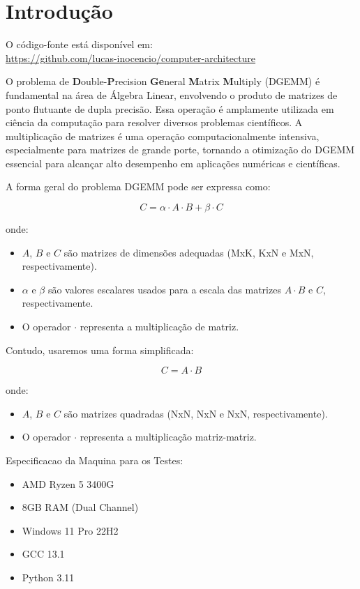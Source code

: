 \documentclass[12pt]{article}
\begin{document}
\section{Introdução}

O código-fonte está disponível em: \\
\url{https://github.com/lucas-inocencio/computer-architecture}

O problema de \textbf{D}ouble-\textbf{P}recision \textbf{Ge}neral \textbf{M}atrix \textbf{M}ultiply (DGEMM) é fundamental na área de Álgebra Linear, envolvendo o produto de matrizes de ponto flutuante de dupla precisão. Essa operação é amplamente utilizada em ciência da computação para resolver diversos problemas científicos. A multiplicação de matrizes é uma operação computacionalmente intensiva, especialmente para matrizes de grande porte, tornando a otimização do DGEMM essencial para alcançar alto desempenho em aplicações numéricas e científicas.

A forma geral do problema DGEMM pode ser expressa como:

\[ C = \alpha \cdot A \cdot B + \beta \cdot C \]

onde:

\begin{itemize}
    \item $A$, $B$ e $C$ são matrizes de dimensões adequadas (MxK, KxN e MxN, respectivamente).
    \item $\alpha$ e $\beta$ são valores escalares usados para a escala das matrizes $A \cdot B$ e $C$, respectivamente.
    \item O operador $\cdot$ representa a multiplicação de matriz.
\end{itemize}

Contudo, usaremos uma forma simplificada:

\[ C = A \cdot B \]

onde:

\begin{itemize}
    \item $A$, $B$ e $C$ são matrizes quadradas (NxN, NxN e NxN, respectivamente).
    \item O operador $\cdot$ representa a multiplicação matriz-matriz.
\end{itemize}


Especificacao da Maquina para os Testes:

\begin{itemize}
    \item AMD Ryzen 5 3400G
    \item 8GB RAM (Dual Channel)
    \item Windows 11 Pro 22H2
    \item GCC 13.1
    \item Python 3.11
\end{itemize}
\end{document}
